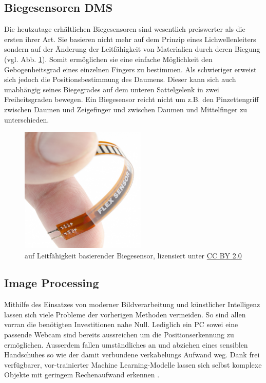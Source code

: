 \documentclass[a4paper,12pt,final]{article} %
\numberwithin{equation}{section} %
\numberwithin{figure}{section} %
\numberwithin{table}{section} %
\begin{document}
\subsection{Biegesensoren DMS}
Die heutzutage erhältlichen Biegesensoren sind wesentlich preiswerter als die ersten ihrer Art. Sie basieren nicht mehr auf dem Prinzip eines Lichwellenleiters sondern auf der Änderung der Leitfähigkeit von Materialien durch deren Biegung (vgl. Abb. \ref{fig:FlexSensor}). Somit ermöglichen sie eine einfache Möglichkeit den Gebogenheitsgrad eines einzelnen Fingers zu bestimmen. Als schwieriger erweist sich jedoch die Positionsbestimmung des Daumens. Dieser kann sich auch unabhängig seines Biegegrades auf dem unteren Sattelgelenk in zwei Freiheitsgraden bewegen. Ein Biegesensor reicht nicht um z.B. den Pinzettengriff zwischen Daumen und Zeigefinger und zwischen Daumen und Mittelfinger zu unterschieden.


\begin{figure}[ht]
	\begin{center}
		\includegraphics[width=6cm]{Bilder/Flex_Sensor.jpg}
		\caption{auf Leitfähigkeit basierender Biegesensor, lizensiert unter \href{https://creativecommons.org/licenses/by/2.0/}{CC BY 2.0}}
		\label{fig:FlexSensor}
	\end{center}
\end{figure}

\subsection{Image Processing}
Mithilfe des Einsatzes von moderner Bildverarbeitung und künstlicher Intelligenz lassen sich viele Probleme der vorherigen Methoden vermeiden. So sind allen vorran die be\-nö\-tig\-ten Investitionen nahe Null. Lediglich ein PC sowei eine passende Webcam sind bereits aussreichen um die Positionserkennung zu ermöglichen. Ausserdem fallen um\-ständ\-liches an und abziehen eines sensiblen Handschuhes so wie der damit verbundene verkabelungs Aufwand weg. Dank frei verfügbarer, vor-trainierter Machine Learning-Modelle lassen sich selbst komplexe Objekte mit geringem Rechenaufwand erkennen \cite{MediaPipe}. 
\end{document}
